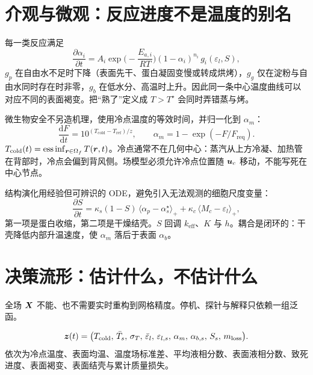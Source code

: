 \section{介观与微观：反应进度不是温度的别名}

每一类反应满足
\begin{equation}
\label{eq:kinetics}
\frac{\partial\alpha_i}{\partial t}
=A_i\exp\!\Big(-\frac{E_{a,i}}{RT}\Big)
(1-\alpha_i)^{n_i}\,g_i(\varepsilon_l,S),
\end{equation}
$g_p$ 在自由水不足时下降（表面先干、蛋白凝固变慢或转成烘烤），$g_g$ 仅在淀粉与自由水同时存在时非零，$g_b$ 在低水分、高温时上升。因此同一条中心温度曲线可以对应不同的表面褐变。把“熟了”定义成 $T>T^\star$ 会同时弄错蒸与烤。

微生物安全不另造机理，使用冷点温度的等效时间，并归一化到 $\alpha_m$：
\begin{equation}
\label{eq:F}
\frac{\mathrm{d}F}{\mathrm{d}t}=10^{(T_{\mathrm{cold}}-T_{\mathrm{ref}})/z},\qquad
\alpha_m=1-\exp(-F/F_{\mathrm{req}}).
\end{equation}
$T_{\mathrm{cold}}(t)=\operatorname{ess\,inf}_{\bm{r}\in\Omega_f}T(\bm{r},t)$。冷点通常不在几何中心：蒸汽从上方冷凝、加热管在背部时，冷点会偏到背风侧。场模型必须允许冷点位置随 $\bm{u}_c$ 移动，不能写死在中心节点。

结构演化用经验但可辨识的 ODE，避免引入无法观测的细胞尺度变量：
\begin{equation}
\label{eq:structure}
\frac{\partial S}{\partial t}
=\kappa_s(1-S)\,\langle\alpha_p-\alpha_s^\star\rangle_+
+\kappa_c\,\langle M_{c}- \varepsilon_l\rangle_+,
\end{equation}
第一项是蛋白收缩，第二项是干燥结壳。$S$ 回调 $k_{\mathrm{eff}}$、$K$ 与 $h$。耦合是闭环的：干壳降低内部升温速度，使 $\alpha_m$ 落后于表面 $\alpha_b$。

\section{决策流形：估计什么，不估计什么}

全场 $\bm{X}$ 不能、也不需要实时重构到网格精度。停机、探针与解释只依赖一组泛函。

\begin{definition}[决策状态]
\label{def:decision}
\begin{equation}
\label{eq:z}
\bm{z}(t)=\big(
T_{\mathrm{cold}},\,
\bar T_s,\,
\sigma_T,\,
\bar\varepsilon_l,\,
\varepsilon_{l,s},\,
\alpha_m,\,
\alpha_{b,s},\,
S_s,\,
m_{\mathrm{loss}}
\big).
\end{equation}
依次为冷点温度、表面均温、温度场标准差、平均液相分数、表面液相分数、致死进度、表面褐变、表面结壳与累计质量损失。
\end{definition}

